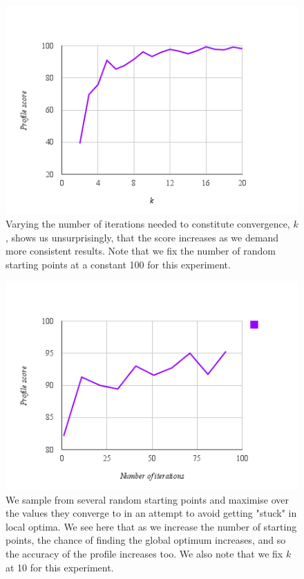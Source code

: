 \documentclass{bioinfo}
\begin{document}
\begin{figure}[h]%
    \centerline{\includegraphics[scale=0.5]{k_score.png}}
\caption{Varying the number of iterations needed to constitute convergence, $k$, shows us unsurprisingly, that the score increases as we demand more consistent results. Note that we fix the number of random starting points at a constant 100 for this experiment.}\label{fig:01}
\end{figure}

\begin{figure}[h]%
    \centerline{\includegraphics[scale=0.5]{iterations_score.png}}
\caption{We sample from several random starting points and maximise over the values they converge to in an attempt to avoid getting "stuck" in local optima. We see here that as we increase the number of starting points, the chance of finding the global optimum increases, and so the accuracy of the profile increases too. We also note that we fix $k$ at 10 for this experiment. }\label{fig:01}
\end{figure}
\end{document}
